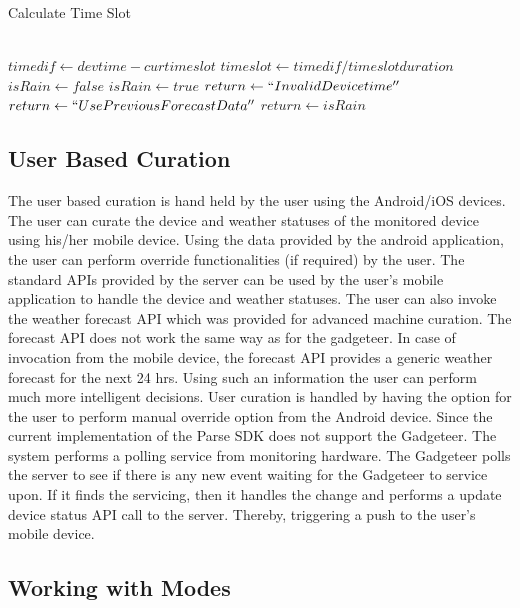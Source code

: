 \documentclass[10pt]{article}
\begin{document}
\begin{algorithm}
\caption{Calculate Time Slot}          %
\label{time_alg}      
\begin{algorithmic}
\\
\State $timedif \gets devtime - curtimeslot$
    \State $timeslot\gets timedif/timeslotduration$
        		\State $isRain \gets false$
    		\Else
    			\State $isRain \gets true$
    		\EndIf
    \Else
    		\State $return \gets ``Invalid Device time''$
    \EndIf
\Else
    \State $return \gets ``Use Previous Forecast Data''$
\EndIf
\State $return \gets isRain$
\end{algorithmic}
\end{algorithm} 


\subsection*{User Based Curation}

The user based curation is hand held by the user using the Android/iOS devices. 
The user can curate the device and weather statuses of the monitored device using his/her mobile device.
Using the data provided by the android application, the user can perform override functionalities (if required) by the user.
The standard APIs provided by the server can be used by the user's mobile application to handle the device and weather statuses.
The user can also invoke the weather forecast API which was provided for advanced machine curation.
The forecast API does not work the same way as for the gadgeteer. 
In case of invocation from the mobile device, the forecast API provides a generic weather forecast for the next 24 hrs. 
Using such an information the user can perform much more intelligent decisions.
User curation is handled by having the option for the user to perform manual override option from the Android device.
Since the current implementation of the Parse SDK does not support the Gadgeteer.
The system performs a polling service from monitoring hardware. 
The Gadgeteer polls the server to see if there is any new event waiting for the Gadgeteer to service upon.
If it finds the servicing, then it handles the change and performs a update device status API call to the server. 
Thereby, triggering a push to the user's mobile device.

\subsection*{Working with Modes}
\end{document}

